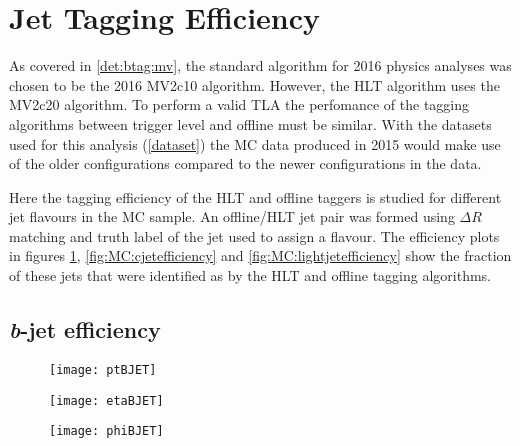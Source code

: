 \newpage
\section{Jet Tagging Efficiency}

	As covered in \ref{det:btag:mv}, the standard algorithm for 2016 physics analyses was chosen to be the 2016 MV2c10 algorithm. However, the HLT \btag algorithm uses the MV2c20 algorithm. \cite{trig2015} To perform a valid TLA the perfomance of the tagging algorithms between trigger level and offline must be similar. With the datasets used for this analysis (\ref{dataset}) the MC data produced in 2015 would make use of the older configurations compared to the newer configurations in the data. 

	Here the tagging efficiency of the HLT and offline taggers is studied for different jet flavours in the MC sample. An offline/HLT jet pair was formed using $\Delta R$ matching and truth label of the jet used to assign a flavour. The efficiency plots in figures \ref{fig:MC:bjetefficiency}, \ref{fig:MC:cjetefficiency} and \ref{fig:MC:lightjetefficiency} show the fraction of these jets that were identified as \bjets by the HLT and offline tagging algorithms.

	\newpage
	\subsection{\textit{b}-jet efficiency}

		\begin{figure}[h]
			\centering
			\begin{minipage}[h]{0.31\linewidth}
				\texttt{[image: ptBJET]}

			\end{minipage}
			\quad
			\begin{minipage}[h]{0.31\linewidth}
				\texttt{[image: etaBJET]}
			\end{minipage}
			\quad
			\begin{minipage}[h]{0.31\linewidth}
				\texttt{[image: phiBJET]}
			\end{minipage}
			\caption{ }
			\label{fig:MC:bjetefficiency}
		\end{figure}


